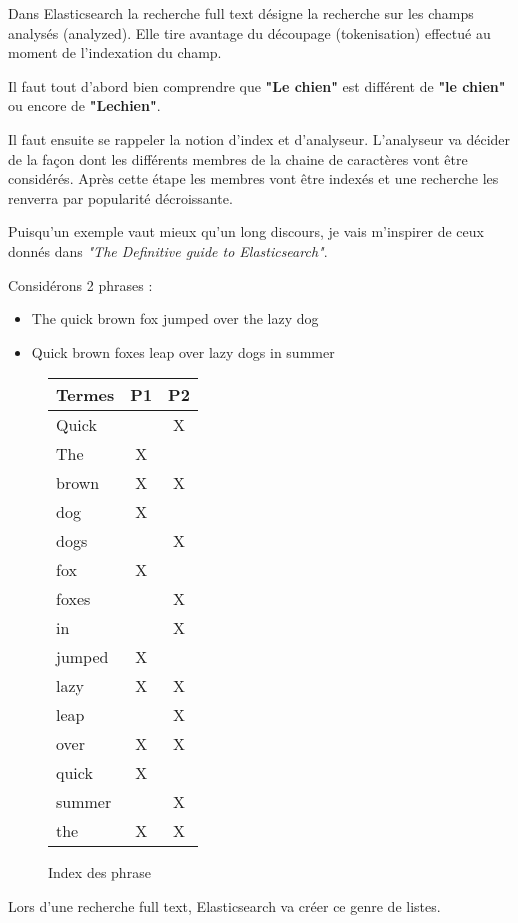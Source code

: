 Dans Elasticsearch la recherche full text désigne la recherche sur les champs analysés
(analyzed). Elle tire avantage du découpage (tokenisation) effectué au moment de 
l'indexation du champ.

Il faut tout d'abord bien comprendre que \textbf{"Le chien"} est différent de \textbf{"le chien"} 
ou encore de \textbf{"Lechien"}.

Il faut ensuite se rappeler la notion d'index et d'analyseur. L'analyseur va
décider de la façon dont les différents membres de la chaine de caractères vont être 
considérés. Après cette étape les membres vont être indexés et une recherche les 
renverra par popularité décroissante.

Puisqu'un exemple vaut mieux qu'un long discours, je vais m'inspirer de ceux donnés
dans \textit{"The Definitive guide to Elasticsearch"}.


Considérons 2 phrases :
\begin{itemize}
    \item The quick brown fox jumped over the lazy dog
    \item Quick brown foxes leap over lazy dogs in summer
\end{itemize}

\begin{figure}[H]
\center
\begin{tabular}{|l||c|c|}
\hline
\textbf{Termes}   & \textbf{P1}    & \textbf{P2}\\ \hline  
Quick   &       &  X\\ \hline  
The     &   X   &   \\ \hline
brown   &   X   &  X\\ \hline
dog     &   X   &   \\ \hline
dogs    &       &  X\\ \hline
fox     &   X   &   \\ \hline
foxes   &       &  X\\ \hline
in      &       &  X\\ \hline
jumped  &   X   &   \\ \hline
lazy    &   X   &  X\\ \hline
leap    &       &  X\\ \hline
over    &   X   &  X\\ \hline
quick   &   X   &   \\ \hline
summer  &       &  X\\ \hline
the     &   X   &  X\\ \hline 
\end{tabular}
\caption{Index des phrase}
\end{figure}
Lors d'une recherche full text, Elasticsearch va créer ce genre de listes.

